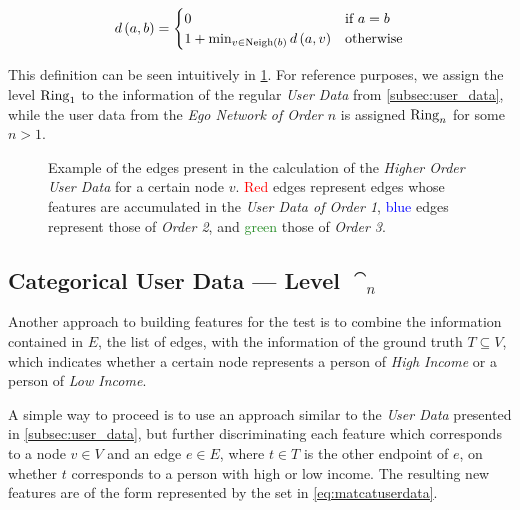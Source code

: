 \begin{equation}
d \left( a, b \right) =
\begin{cases}
	0 & \text{if } a = b \\
	1 + \min_{v \in \operatorname{Neigh} \left(b \right)} d \left( a, v \right) & \text{otherwise}
\end{cases}
\label{eq:distance}
\end{equation}

This definition can be seen intuitively in \cref{fig:higherorderuserdata}. For reference purposes, we assign the level $\operatorname{Ring}_1$ to the information of the regular \emph{User Data} from \cref{subsec:user_data}, while the user data from the \emph{Ego Network of Order $n$} is assigned $\operatorname{Ring}_n$ for some $n > 1$. %


\begin{figure}
\centering
\framebox[\columnwidth]{%
	
}
\caption{Example of the edges present in the calculation of the \emph{Higher Order User Data} for a certain node $v$. \textcolor{red}{Red} edges represent edges whose features are accumulated in the \emph{User Data of Order 1}, \textcolor{blue}{blue} edges represent those of \emph{Order 2}, and \textcolor{ForestGreen}{green} those of \emph{Order 3}.}
\label{fig:higherorderuserdata}
\end{figure}

\subsection{Categorical User Data --- Level $\cat_n$}
\label{subsec:categoricaluserdata}

Another approach to building features for the test is to combine the information contained in $E$, the list of edges, with the information of the ground truth $T \subseteq V$, which indicates whether a certain node represents a person of \emph{High Income} or a person of \emph{Low Income}.



A simple way to proceed is to use an approach similar to the \emph{User Data} presented in \cref{subsec:user_data}, but further discriminating each feature which corresponds to a node $v \in V$ and an edge $e \in E$, where $t \in T$ is the other endpoint of $e$, on whether $t$ corresponds to a person with high or low income. The resulting new features are of the form represented by the set in \cref{eq:matcatuserdata}.


